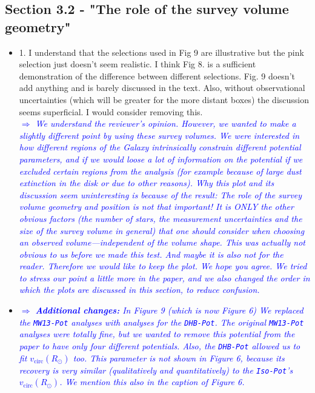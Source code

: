 \documentclass[10pt,a4paper]{article}
\newcommand{\Comment}[1]{\textsl{\textcolor{Blue}{$\Longrightarrow$ {#1}}}}
\begin{document}
\subsection{Section 3.2 - "The role of the survey volume geometry"}
\begin{itemize}
\item 1. I understand that the selections used in Fig 9 are illustrative but the pink selection just doesn't seem realistic. I think Fig 8. is a sufficient demonstration of the difference between different selections. Fig. 9 doesn't add anything and is barely discussed in the text. Also, without observational uncertainties (which will be greater for the more distant boxes) the discussion seems superficial. I would consider removing this. \\\Comment{We understand the reviewer's opinion. However, we wanted to make a slightly different point by using these survey volumes. We were interested in how different regions of the Galaxy intrinsically constrain different potential parameters, and if we would loose a lot of information on the potential if we excluded certain regions from the analysis (for example because of large dust extinction in the disk or due to other reasons). Why this plot and its discussion seem uninteresting is because of the result: The role of the survey volume geometry and position is not that important! It is ONLY the other obvious factors (the number of stars, the measurement uncertainties and the size of the survey volume in general) that one should consider when choosing an observed volume---independent of the volume shape. This was actually not obvious to us before we made this test. And maybe it is also not for the reader. Therefore we would like to keep the plot. We hope you agree. We tried to stress our point a little more in the paper, and we also changed the order in which the plots are discussed in this section, to reduce confusion.}
\item \Comment{\textbf{Additional changes:} In Figure 9 (which is now Figure 6) We replaced the \texttt{MW13-Pot} analyses with analyses for the \texttt{DHB-Pot}. The original \texttt{MW13-Pot} analyses were totally fine, but we wanted to remove this potential from the paper to have only four different potentials. Also, the \texttt{DHB-Pot} allowed us to fit $v_\text{circ}(R_\odot)$ too. This parameter is not shown in Figure 6, because its recovery is very similar (qualitatively and quantitatively) to the \texttt{Iso-Pot}'s $v_\text{circ}(R_\odot)$. We mention this also in the caption of Figure 6.}
\end{itemize}
\end{document}
